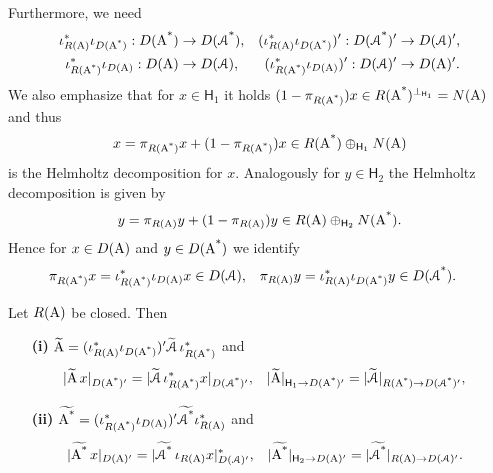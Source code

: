 \documentclass[a4paper]{amsart}
\renewcommand{\H}{\mathsf{H}}
\begin{document}
Furthermore, we need
\begin{align*}
\iota_{R(\operatorname{A})}^{*}\iota_{D(\operatorname{\operatorname{A}^{*}})}:D(\operatorname{\operatorname{A}^{*}})&\to D(\operatorname{\operatorname{\mathcal{A}}^{*}}),
&
(\iota_{R(\operatorname{A})}^{*}\iota_{D(\operatorname{\operatorname{A}^{*}})})':D(\operatorname{\operatorname{\mathcal{A}}^{*}})'&\to D(\operatorname{\mathcal{A}})',\\
\iota_{R(\operatorname{\operatorname{A}^{*}})}^{*}\iota_{D(\operatorname{A})}:D(\operatorname{A})&\to D(\operatorname{\mathcal{A}}),
&
(\iota_{R(\operatorname{\operatorname{A}^{*}})}^{*}\iota_{D(\operatorname{A})})':D(\operatorname{\mathcal{A}})'&\to D(\operatorname{A})'.
\end{align*}
We also emphasize that for $x\in\H_{1}$ it holds 
$(1-\pi_{R(\As)})x\in R(\As)^{\bot_{\H_{1}}}=N(\A)$ and thus
$$x=\pi_{R(\As)}x+(1-\pi_{R(\As)})x\in R(\As)\oplus_{\H_{1}}N(\A)$$
is the Helmholtz decomposition for $x$. 
Analogously for $y\in\H_{2}$ the Helmholtz decomposition is given by
$$y=\pi_{R(\A)}y+(1-\pi_{R(\A)})y\in R(\A)\oplus_{\H_{2}}N(\As).$$
Hence for $x\in D(\operatorname{A})$ and $y\in D(\operatorname{\operatorname{A}^{*}})$ we identify
\begin{align}
\mylabel{piRADA}
\pi_{R(\As)}x
&=\iota_{R(\As)}^{*}\iota_{D(\A)}x\in D(\cA),
&
\pi_{R(\A)}y
&=\iota_{R(\A)}^{*}\iota_{D(\As)}y\in D(\cAs).
\end{align}

\begin{lem}
Let $R(\operatorname{A})$ be closed. Then 
\begin{itemize}
\item[\bf(i)]
$\widetilde{\operatorname{A}}=(\iota_{R(\operatorname{A})}^{*}\iota_{D(\operatorname{\operatorname{A}^{*}})})'\widetilde{\operatorname{\mathcal{A}}}\,\iota_{R(\operatorname{\operatorname{A}^{*}})}^{*}$
and
\begin{align*}
|\widetilde{\A}\,x|_{D(\As)'}
&=|\widetilde{\cA}\,\iota_{R(\As)}^{*}x|_{D(\cAs)'},
&
|\widetilde{\A}|_{\H_{1}\to D(\As)'}
&=|\widetilde{\cA}|_{R(\As)\to D(\cAs)'},
\end{align*}
\item[\bf(ii)]
$\widetilde{\operatorname{\operatorname{A}^{*}}}=(\iota_{R(\operatorname{\operatorname{A}^{*}})}^{*}\iota_{D(\operatorname{A})})'\widetilde{\operatorname{\operatorname{\mathcal{A}}^{*}}}\iota_{R(\operatorname{A})}^{*}$
and 
\begin{align*}
|\widetilde{\As}\,x|_{D(\A)'}
&=|\widetilde{\cAs}\,\iota_{R(\A)}x|_{D(\cA)'}^{*},
&
|\widetilde{\As}|_{\H_{2}\to D(\A)'}
&=|\widetilde{\cAs}|_{R(\A)\to D(\cA)'}.
\end{align*}
\end{itemize}
\end{lem}
\end{document}
